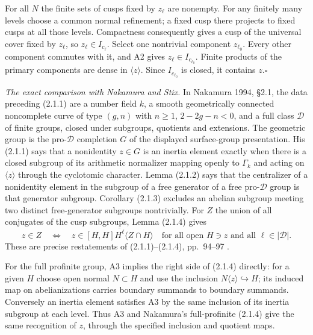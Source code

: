 For all $N$ the finite sets of cusps fixed by $z_\ell$ are nonempty. For any finitely many levels choose a common normal refinement; a fixed cusp there projects to fixed cusps at all those levels. Compactness consequently gives a cusp of the universal cover fixed by $z_\ell$, so $z_\ell\in I_{c_\ell}$. Select one nontrivial component $z_{\ell_0}$. Every other component commutes with it, and A2 gives $z_\ell\in I_{c_{\ell_0}}$. Finite products of the primary components are dense in $\langle z\rangle$. Since $I_{c_{\ell_0}}$ is closed, it contains $z$.\hfill$\square$

\emph{The exact comparison with Nakamura and Stix.} In Nakamura 1994, \S2.1, the data preceding (2.1.1) are a number field $k$, a smooth geometrically connected noncomplete curve of type $(g,n)$ with $n\ge1$, $2-2g-n<0$, and a full class $\mathcal D$ of finite groups, closed under subgroups, quotients and extensions. The geometric group is the pro-$\mathcal D$ completion $G$ of the displayed surface-group presentation. His (2.1.1) says that a nonidentity $z\in G$ is an inertia element exactly when there is a closed subgroup of its arithmetic normalizer mapping openly to $\Gamma_k$ and acting on $\langle z\rangle$ through the cyclotomic character. Lemma (2.1.2) says that the centralizer of a nonidentity element in the subgroup of a free generator of a free pro-$\mathcal D$ group is that generator subgroup. Corollary (2.1.3) excludes an abelian subgroup meeting two distinct free-generator subgroups nontrivially. For $Z$ the union of all conjugates of the cusp subgroups, Lemma (2.1.4) gives
\[
 z\in Z\quad\Longleftrightarrow\quad
 z\in\overline{[H,H]H^\ell\langle Z\cap H\rangle}
 \quad\text{for all open }H\ni z\text{ and all }\ell\in|\mathcal D|.
\]
These are precise restatements of (2.1.1)--(2.1.4), pp.~94--97 \cite{Nakamura1994}.

For the full profinite group, A3 implies the right side of (2.1.4) directly: for a given $H$ choose open normal $N\subset H$ and use the inclusion $N\langle z\rangle\hookrightarrow H$; its induced map on abelianizations carries boundary summands to boundary summands. Conversely an inertia element satisfies A3 by the same inclusion of its inertia subgroup at each level. Thus A3 and Nakamura's full-profinite (2.1.4) give the same recognition of $z$, through the specified inclusion and quotient maps.

